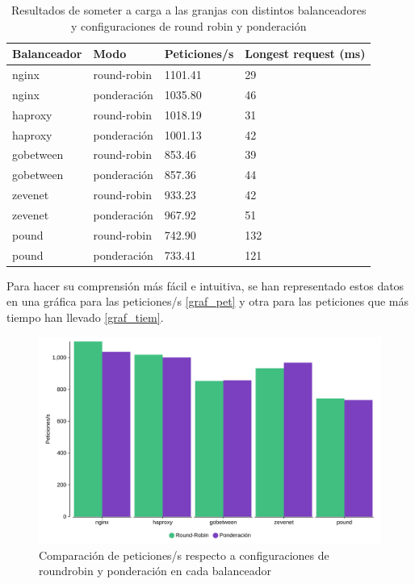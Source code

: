 \begin{table}[!ht]
\caption{Resultados de someter a carga a las granjas con distintos balanceadores y configuraciones de round robin y ponderación}
    \centering
    \begin{tabular}{|l|l|l|l|}
    \hline
        Balanceador & Modo & Peticiones/s & Longest request (ms) \\ \hline
        nginx & round-robin & 1101.41 & 29 \\ \hline
        nginx & ponderación & 1035.80 & 46 \\ \hline
        haproxy & round-robin & 1018.19 & 31 \\ \hline
        haproxy & ponderación & 1001.13 & 42 \\ \hline
        gobetween & round-robin & 853.46 & 39 \\ \hline
        gobetween & ponderación & 857.36 & 44 \\ \hline
        zevenet & round-robin & 933.23 & 42 \\ \hline
        zevenet & ponderación & 967.92 & 51 \\ \hline
        pound & round-robin & 742.90 & 132 \\ \hline
        pound & ponderación & 733.41 & 121 \\ \hline
    \end{tabular}
\label{tabla}
\end{table}

Para hacer su comprensión más fácil e intuitiva, se han representado estos datos en una gráfica para las peticiones/s \eqref{graf_pet} y otra para las peticiones que más tiempo han llevado \eqref{graf_tiem}.

\begin{figure}[h!]
\begin{center}
\caption{Comparación de peticiones/s respecto a configuraciones de roundrobin y ponderación en cada balanceador}
\label{graf_pet}
\includegraphics[scale=0.05]{peticioness}
\end{center}
\end{figure}

